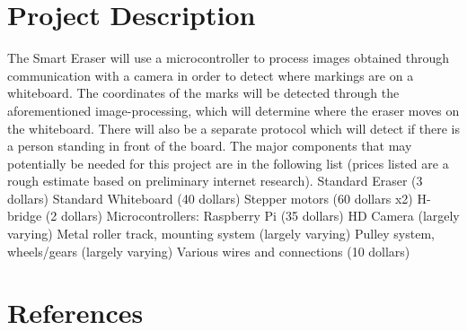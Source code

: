 \documentclass{IEEEtran}					%
\begin{document}
	\section{Project Description}
	The Smart Eraser will use a microcontroller to process images obtained through communication with a camera in order to detect where markings are on a whiteboard. The coordinates of the marks will be detected through the aforementioned image-processing, which will determine where the eraser moves on the whiteboard. There will also be a separate protocol which will detect if there is a person standing in front of the board. The major components that may potentially be needed for this project are in the following list (prices listed are a rough estimate based on preliminary internet research).
Standard Eraser (3 dollars)
Standard Whiteboard (40 dollars)
Stepper motors (60 dollars x2)
H-bridge (2 dollars)
Microcontrollers: Raspberry Pi (35 dollars)
HD Camera (largely varying)
Metal roller track, mounting system (largely varying)
Pulley system, wheels/gears (largely varying)
Various wires and connections (10 dollars)

	
	\section*{References}
\end{document}
